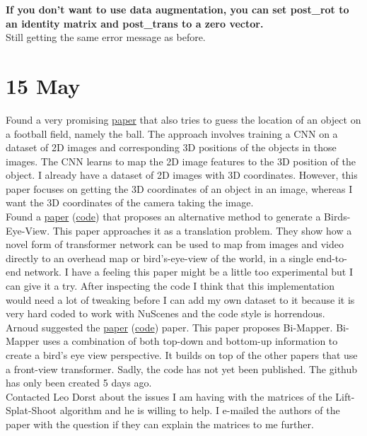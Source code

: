 \documentclass[twoside]{report}
\begin{document}
\textbf{If you don't want to use data augmentation, you can set post\_rot to an identity matrix and post\_trans to a zero vector.}
\hfill \break \\
Still getting the same error message as before. 


\section*{15 May}
Found a very promising \href{https://kth.diva-portal.org/smash/get/diva2:1335815/FULLTEXT01.pdf}{paper} that also tries to guess the location of an object on a football field, namely the ball. The approach involves training a CNN on a dataset of 2D images and corresponding 3D positions of the objects in those images. The CNN learns to map the 2D image features to the 3D position of the object.
I already have a dataset of 2D images with 3D coordinates. However, this paper focuses on getting the 3D coordinates of an object in an image, whereas I want the 3D coordinates of the camera taking the image. 
\hfill \break \\
Found a \href{https://arxiv.org/pdf/2110.00966.pdf}{paper} (\href{https://github.com/avishkarsaha/translating-images-into-maps}{code}) that proposes an alternative method to generate a Birds-Eye-View. This paper approaches it as a translation problem. They show how a novel form of transformer network can be used to map from images and video directly to an overhead map or bird’s-eye-view of the world, in a single end-to-end network. I have a feeling this paper might be a little too experimental but I can give it a try. After inspecting the code I think that this implementation would need a lot of tweaking before I can add my own dataset to it because it is very hard coded to work with NuScenes and the code style is horrendous. 
\hfill \break \\
Arnoud suggested the \href{https://arxiv.org/pdf/2305.04205.pdf}{paper} (\href{https://github.com/lynn-yu/Bi-Mapper}{code}) paper. This paper proposes Bi-Mapper. Bi-Mapper uses a combination of both top-down and bottom-up information to create a bird's eye view perspective. It builds on top of the other papers that use a front-view transformer. Sadly, the code has not yet been published. The github has only been created 5 days ago.
\hfill \break \\
Contacted Leo Dorst about the issues I am having with the matrices of the Lift-Splat-Shoot algorithm and he is willing to help. 
I e-mailed the authors of the paper with the question if they can explain the matrices to me further. 
\end{document}
